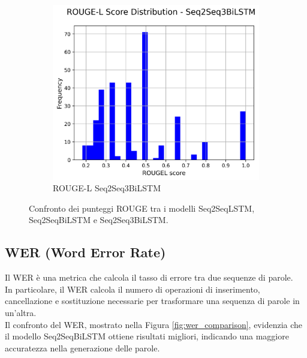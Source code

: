 \documentclass[a4paper, 12pt]{article}
\begin{document}
\begin{figure}[H]
\begin{subfigure}{0.32\textwidth}
    \end{subfigure}
    \hfill
    \begin{subfigure}{0.32\textwidth}
        \centering
        \includegraphics[width=\textwidth]{media/Seq2Seq3BiLSTM_rougeL_scores.png}
        \caption{ROUGE-L Seq2Seq3BiLSTM}
    \end{subfigure}
    
    \caption{Confronto dei punteggi ROUGE tra i modelli Seq2SeqLSTM, Seq2SeqBiLSTM e Seq2Seq3BiLSTM.}
    \label{fig:rouge_comparison}
\end{figure}

\subsection{WER (Word Error Rate)}
Il WER è una metrica che calcola il tasso di errore tra due sequenze di parole.\\
In particolare, il WER calcola il numero di operazioni di inserimento, cancellazione e sostituzione necessarie per trasformare una sequenza di parole in un'altra.\\

Il confronto del WER, mostrato nella Figura \ref{fig:wer_comparison}, evidenzia che il modello Seq2SeqBiLSTM ottiene risultati migliori, indicando una maggiore accuratezza nella generazione delle parole.
\end{document}
